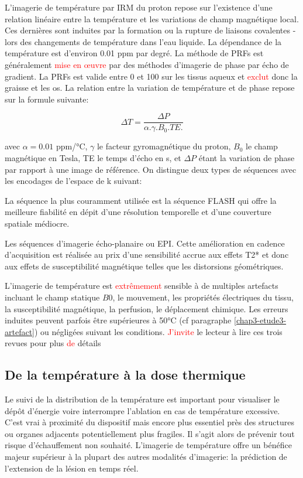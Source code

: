 L'imagerie de température par IRM du proton  repose sur l'existence d'une relation linéaire entre la température et les variations de champ magnétique local. Ces dernières sont induites par la formation ou la rupture de liaisons covalentes - lors des changements de température dans l'eau liquide. La dépendance de la température est d'environ 0.01 \ac{ppm} par degré. La méthode de \ac{PRFs} est généralement \textcolor{red}{mise en œuvre} par des méthodes d'imagerie de phase par écho de gradient. La \ac{PRFs} est valide entre 0 et 100 \textcelsius sur les tissus aqueux et \textcolor{red}{exclut} donc la graisse et les os. La relation entre la variation de température et de phase repose sur la formule suivante:

\[
\Delta T= \frac{\Delta P}{\alpha.\gamma.B_{0}.TE.}
\]

avec $\alpha=0.01$ ppm/°C, $\gamma$ le facteur gyromagnétique du proton, $B_{0}$ le champ magnétique en Tesla, TE le temps d'écho en s, et $\Delta P$ étant la variation de phase par rapport à une image de référence. On distingue deux types de séquences avec les encodages de l'espace de k suivant:

\begin{description}
\item La séquence la plus couramment utilisée est la séquence \ac{FLASH} qui offre la meilleure fiabilité en dépit d'une résolution temporelle et d'une couverture spatiale médiocre.
\item Les séquences d'imagerie écho-planaire ou \ac{EPI}. Cette amélioration en cadence d'acquisition est réalisée au prix d'une sensibilité accrue aux effets T2* et donc aux effets de susceptibilité magnétique telles que les distorsions géométriques.
\end{description}

L'imagerie de température est \textcolor{red}{extrêmement} sensible à de multiples artefacts incluant le champ statique $B0$, le mouvement, les propriétés électriques du tissu, la susceptibilité magnétique, la perfusion, le déplacement chimique. Les erreurs induites peuvent parfois être supérieures à 50°C (cf paragraphe \ref{chap3-etude3-artefact}) ou négligées suivant les conditions. \textcolor{red}{J'invite} le lecteur à lire ces trois revues pour plus \textcolor{red}{de} détails \cite{winter2016magnetic,odeen2019magnetic,lutz2020contactless}

\subsection{De la température à la dose thermique}

Le suivi de la distribution de la température est important pour visualiser le dépôt d'énergie voire interrompre l'ablation en cas de température excessive. C'est vrai à proximité du dispositif mais encore plus essentiel près des structures ou organes adjacents potentiellement plus fragiles. Il s'agit alors de prévenir tout risque d'échauffement non souhaité. L'imagerie de température offre un bénéfice majeur supérieur à la plupart des autres modalités d'imagerie: la prédiction de l'extension de la lésion en temps réel.\\
